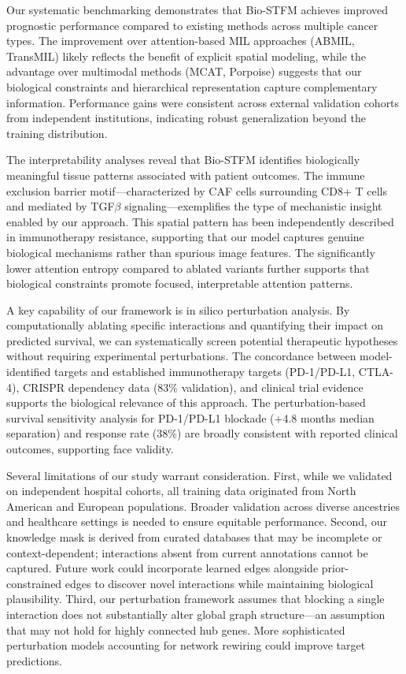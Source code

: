 \documentclass[pdflatex,sn-nature]{sn-jnl}%
\theoremstyle{thmstyleone}%
\theoremstyle{thmstyletwo}%
\theoremstyle{thmstylethree}%
\begin{document}
Our systematic benchmarking demonstrates that Bio-STFM achieves improved prognostic performance compared to existing methods across multiple cancer types. The improvement over attention-based MIL approaches (ABMIL, TransMIL) likely reflects the benefit of explicit spatial modeling, while the advantage over multimodal methods (MCAT, Porpoise) suggests that our biological constraints and hierarchical representation capture complementary information. Performance gains were consistent across external validation cohorts from independent institutions, indicating robust generalization beyond the training distribution.

The interpretability analyses reveal that Bio-STFM identifies biologically meaningful tissue patterns associated with patient outcomes. The immune exclusion barrier motif---characterized by CAF cells surrounding CD8+ T cells and mediated by TGF$\beta$ signaling\cite{bib56}---exemplifies the type of mechanistic insight enabled by our approach. This spatial pattern has been independently described in immunotherapy resistance\cite{bib24,bib25,bib71}, supporting that our model captures genuine biological mechanisms rather than spurious image features. The significantly lower attention entropy compared to ablated variants further supports that biological constraints promote focused, interpretable attention patterns\cite{bib65}.

A key capability of our framework is in silico perturbation analysis\cite{bib66}. By computationally ablating specific interactions and quantifying their impact on predicted survival, we can systematically screen potential therapeutic hypotheses without requiring experimental perturbations\cite{bib64}. The concordance between model-identified targets and established immunotherapy targets (PD-1/PD-L1, CTLA-4)\cite{bib20,bib54}, CRISPR dependency data (83\% validation)\cite{bib19}, and clinical trial evidence supports the biological relevance of this approach. The perturbation-based survival sensitivity analysis for PD-1/PD-L1 blockade (+4.8 months median separation) and response rate (38\%) are broadly consistent with reported clinical outcomes, supporting face validity.

Several limitations of our study warrant consideration. First, while we validated on independent hospital cohorts, all training data originated from North American and European populations. Broader validation across diverse ancestries and healthcare settings is needed to ensure equitable performance\cite{bib68}. Second, our knowledge mask is derived from curated databases that may be incomplete or context-dependent; interactions absent from current annotations cannot be captured\cite{bib16,bib17}. Future work could incorporate learned edges alongside prior-constrained edges to discover novel interactions while maintaining biological plausibility\cite{bib42}. Third, our perturbation framework assumes that blocking a single interaction does not substantially alter global graph structure---an assumption that may not hold for highly connected hub genes. More sophisticated perturbation models accounting for network rewiring could improve target predictions.
\end{document}
